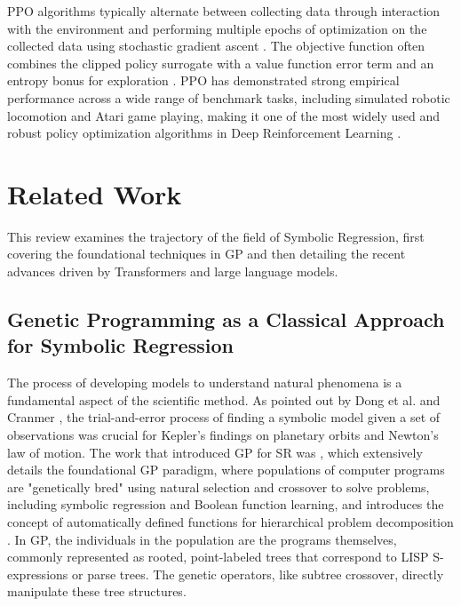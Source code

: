 PPO algorithms typically alternate between collecting data through interaction with the environment and performing multiple epochs of optimization on the collected data using stochastic gradient ascent \cite{Schulman2017ProximalPO}. The objective function often combines the clipped policy surrogate with a value function error term and an entropy bonus for exploration \cite{Schulman2017ProximalPO}. PPO has demonstrated strong empirical performance across a wide range of benchmark tasks, including simulated robotic locomotion and Atari game playing, making it one of the most widely used and robust policy optimization algorithms in Deep Reinforcement Learning \cite{Schulman2017ProximalPO}.

    
\section{Related Work}
This review examines the trajectory of the field of Symbolic Regression, first covering the foundational techniques in GP and then detailing the recent advances driven by Transformers and large language models.

\subsection{Genetic Programming as a Classical Approach for Symbolic Regression}
The process of developing models to understand natural phenomena is a fundamental aspect of the scientific method. As pointed out by Dong et al. \cite{dong2025RecentAdvances} and Cranmer \cite{cranmer2023interpretable}, the trial-and-error process of finding a symbolic model given a set of observations was crucial for Kepler's findings on planetary orbits and Newton's law of motion. The work that introduced GP for SR was \cite{Koza1992}, which extensively details the foundational GP paradigm, where populations of computer programs are "genetically bred" using natural selection and crossover to solve problems, including symbolic regression and Boolean function learning, and introduces the concept of automatically defined functions for hierarchical problem decomposition \cite{Koza1992}. In GP, the individuals in the population are the programs themselves, commonly represented as rooted, point-labeled trees that correspond to LISP S-expressions or parse trees. The genetic operators, like subtree crossover, directly manipulate these tree structures. 

